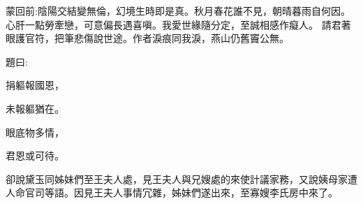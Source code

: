 
\begin{parag}
    \begin{note}蒙回前:陰陽交結變無倫，幻境生時即是真。秋月春花誰不見，朝晴暮雨自何因。心肝一點勞牽戀，可意偏長遇喜嗔。我愛世緣隨分定，至誠相感作癡人。
        請君著眼護官符，把筆悲傷說世途。作者淚痕同我淚，燕山仍舊竇公無。\end{note}
\end{parag}


\begin{parag}
    題曰:
\end{parag}


\begin{poem}
    \begin{pl}捐軀報國恩，\end{pl}
    \begin{pl}未報軀猶在。\end{pl}

    \begin{pl}眼底物多情，\end{pl}
    \begin{pl}君恩或可待。\end{pl}
\end{poem}


\begin{parag}
    卻說黛玉同姊妹們至王夫人處，見王夫人與兄嫂處的來使計議家務，又說姨母家遭人命官司等語。因見王夫人事情冗雜，姊妹們遂出來，至寡嫂李氏房中來了。
\end{parag}


